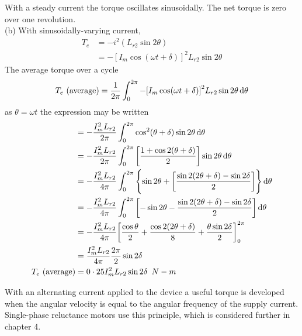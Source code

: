 \documentclass[a4paper,numbers=noenddot,12pt]{scrbook}
\begin{document}
            With a steady current the torque oscillates sinusoidally. The net torque is zero over one revolution.\\
            (b) With sinusoidally-varying current,
            \begin{align*}
                T_e & = -i^2 (L_{r2} \sin 2 \theta) \\
                & = -{[I_m \cos (\omega t + \delta)]}^2 L_{r2} \sin 2 \theta
            \end{align*}
            The average torque over a cycle
            \begin{equation}
                T_e\ (\text{average}) = \dfrac{1}{2 \pi} \int_0^{2 \pi} - {[I_m \cos (\omega t + \delta)]}^2 L_{r2} \sin 2\theta \dif \theta
                \label{eq:Eq3.44}
            \end{equation}
            as $\theta = \omega t$ the expression may be written
            \begin{align}
                & = -\dfrac{I_m^2 L_{r2}}{2 \pi} \int_0^{2 \pi} \cos^2(\theta + \delta) \sin 2 \theta \dif \theta \nonumber \\
                & = -\dfrac{I_m^2 L_{r2}}{2 \pi} \int_0^{2 \pi} \left[\dfrac{1 + \cos 2 (\theta + \delta)}{2} \right] \sin 2 \theta \dif \theta \nonumber \\
                & = -\dfrac{I_m^2 L_{r2}}{4 \pi} \int_0^{2 \pi} \left\{\sin 2 \theta +  \left[\dfrac{\sin 2 (2 \theta + \delta) - \sin 2 \delta}{2} \right] \right\} \dif \theta \nonumber \\
                & = -\dfrac{I_m^2 L_{r2}}{4 \pi} \int_0^{2 \pi} \left[ -\sin 2 \theta - \dfrac{\sin 2 (2 \theta + \delta) - \sin 2 \delta}{2} \right] \dif \theta \nonumber \\
                & = -\dfrac{I_m^2 L_{r2}}{4 \pi} {\left[ \dfrac{\cos  \theta}{2} + \dfrac{\cos 2 (2 \theta +\delta)}{8} + \dfrac{\theta \sin 2 \delta}{2} \right]}_0^{2 \pi} \nonumber \\
                & =\dfrac{I_m^2 L_{r2}}{4 \pi} \dfrac{2 \pi}{2} \sin 2 \delta \nonumber \\
                T_e\ (\text{average}) & = 0 \cdot 25 I_m^2 L_{r2}\sin 2 \delta \enspace N - m
            \end{align}

            With an alternating current applied to the device a useful torque is developed when the angular velocity is equal to the angular frequency of the supply current. Single-phase reluctance motors use this principle, which is considered further in chapter 4.
\end{document}
